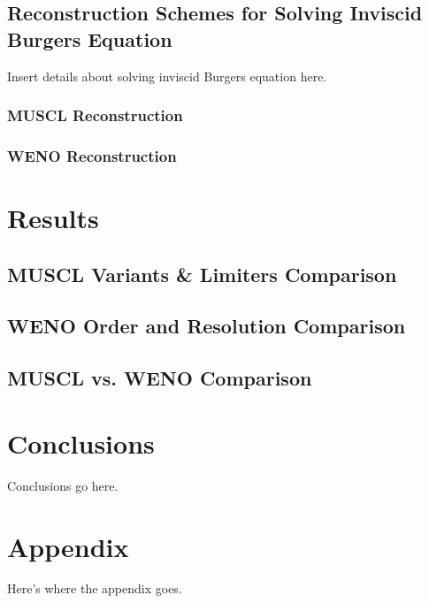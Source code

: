 \documentclass[conf]{new-aiaa}
\begin{document}
\subsection{Reconstruction Schemes for Solving Inviscid Burgers Equation}
Insert details about solving inviscid Burgers equation here.
\subsubsection{MUSCL Reconstruction}
\subsubsection{WENO Reconstruction}


\section{Results}

\subsection{MUSCL Variants \& Limiters Comparison}

\subsection{WENO Order and Resolution Comparison}

\subsection{MUSCL vs. WENO Comparison}


\section{Conclusions}
Conclusions go here.

\newpage
\section*{Appendix}

Here's where the appendix goes.


\end{document}
